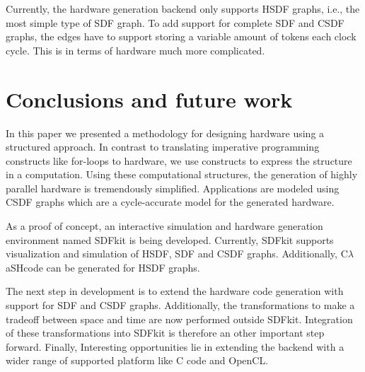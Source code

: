 \documentclass[journal]{IEEEtran}
\newcommand{\clash}{C$\lambda$aSH}
\begin{document}
  Currently, the hardware generation backend only supports HSDF graphs, i.e., the most simple type of SDF graph.
  To add support for complete SDF and CSDF graphs, the edges have to support storing a variable amount of tokens each clock cycle.
  This is in terms of hardware much more complicated.

\section{Conclusions and future work}
\label{sec:conclusions}

  In this paper we presented a methodology for designing hardware using a structured approach.
  In contrast to translating imperative programming constructs like for-loops to hardware, we use constructs to express the structure in a computation.
  Using these computational structures, the generation of highly parallel hardware is tremendously simplified.
  Applications are modeled using CSDF graphs which are a cycle-accurate model for the generated hardware.

  As a proof of concept, an interactive simulation and hardware generation environment named SDFkit is being developed.
  Currently, SDFkit supports visualization and simulation of HSDF, SDF and CSDF graphs.
  Additionally, \clash code can be generated for HSDF graphs.

  The next step in development is to extend the hardware code generation with support for SDF and CSDF graphs.
  Additionally, the transformations to make a tradeoff between space and time are now performed outside SDFkit.
  Integration of these transformations into SDFkit is therefore an other important step forward.
  Finally, Interesting opportunities lie in extending the backend with a wider range of supported platform like C code and OpenCL.
  
\ifCLASSOPTIONcaptionsoff
  \newpage
\fi





%
%
%
\end{document}
